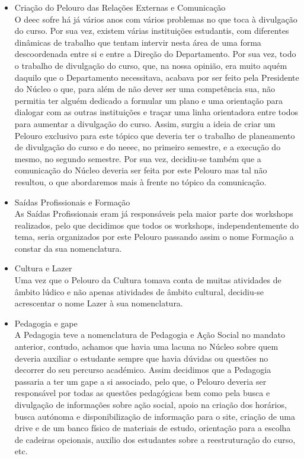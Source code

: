 \begin{itemize}
\item Criação do Pelouro das Relações Externas e Comunicação\\
O \acrshort{deec} sofre há já vários anos com vários problemas no que toca à divulgação do curso. Por sua vez, existem várias instituições estudantis, com diferentes dinâmicas de trabalho que tentam intervir nesta área de uma forma descoordenada entre si e entre a Direção do Departamento. Por sua vez, todo o trabalho de divulgação do curso, que, na nossa opinião, era muito aquém daquilo que o Departamento necessitava, acabava por ser feito pela Presidente do Núcleo o que, para além de não dever ser uma competência sua, não permitia ter alguém dedicado a formular um plano e uma orientação para dialogar com as outras instituições e traçar uma linha orientadora entre todos para aumentar a divulgação do curso. Assim, surgiu a ideia de criar um Pelouro exclusivo para este tópico que deveria ter o trabalho de planeamento de divulgação do curso e do \acrshort{neeec}, no primeiro semestre, e a execução do mesmo, no segundo semestre. Por sua vez, decidiu-se também que a comunicação do Núcleo deveria ser feita por este Pelouro mas tal não resultou, o que abordaremos mais à frente no tópico da comunicação.

\item Saídas Profissionais e Formação\\
As Saídas Profissionais eram já responsáveis pela maior parte dos workshops realizados, pelo que decidimos que todos os workshops, independentemente do tema, seria organizados por este Pelouro passando assim o nome Formação a constar da sua nomenclatura.

\item Cultura e Lazer\\
Uma vez que o Pelouro da Cultura tomava conta de muitas atividades de âmbito lúdico e não apenas atividades de âmbito cultural, decidiu-se acrescentar o nome Lazer à sua nomenclatura.

\item Pedagogia e \acrshort{gape}\\
A Pedagogia teve a nomenclatura de Pedagogia e Ação Social no mandato anterior, contudo, achamos que havia uma lacuna no Núcleo sobre quem deveria auxiliar o estudante sempre que havia dúvidas ou questões no decorrer do seu percurso académico. Assim decidimos que a Pedagogia passaria a ter um \acrfull{gape} a si associado, pelo que, o Pelouro deveria ser responsável por todas as questões pedagógicas bem como pela busca e divulgação de informações sobre ação social, apoio na criação dos horários, busca autónoma e disponibilização de informação para o site, criação de uma drive e de um banco físico de materiais de estudo, orientação para a escolha de cadeiras opcionais, auxilio dos estudantes sobre a reestruturação do curso, etc.
\end{itemize}

